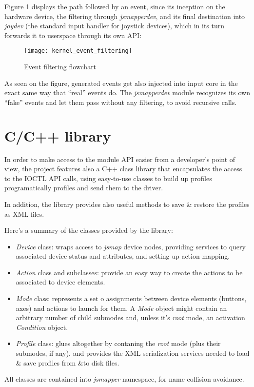 Figure \ref{fig:kernel_event_filtering} displays the path followed by an event, since its inception on the hardware device, the filtering through \emph{jsmapperdev}, and its final destination into \emph{joydev} (the standard input handler for joystick devices), which in its turn forwards it to userspace through its own API:

\begin{figure}[htb]
\centering
\texttt{[image: kernel\_event\_filtering]}
\caption{Event filtering flowchart}
\label{fig:kernel_event_filtering}
\end{figure}

As seen on the figure, generated events get also injected into input core in the exact same way that ``real'' events do. The \emph{jsmapperdev} module recognizes its own ``fake'' events and let them pass without any filtering, to avoid recursive calls.


\section{C/C++ library}
In order to make access to the module API easier from a developer's point of view, the project features also a C++ class library that encapsulates the access to the IOCTL API calls, using easy-to-use classes to build up profiles programatically profiles and send them to the driver.

In addition, the library provides also useful methods to save \& restore the profiles as XML files.

Here's a summary of the classes provided by the library:
\begin{itemize}
 \item \emph{Device} class: wraps access to \emph{jsmap} device nodes, providing services to query associated device status and attributes, and setting up action mapping.
 \item \emph{Action} class and subclasses: provide an easy way to create the actions to be associated to device elements.
 \item \emph{Mode} class: represents a set o assignments between device elements (buttons, axes) and actions to launch for them. A \emph{Mode} object might contain an arbitrary number of child submodes and, unless it's \emph{root} mode, an activation \emph{Condition} object.
 \item \emph{Profile} class: glues altogether by contaning the \emph{root} mode (plus their submodes, if any), and provides the XML serialization services needed to load \& save profiles from \&to disk files. 
\end{itemize}

All classes are contained into \emph{jsmapper} namespace, for name collision avoidance.

